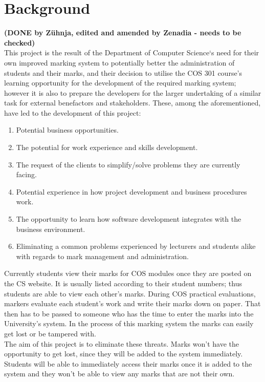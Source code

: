 \documentclass[11pt,a4paper]{article}
\begin{document}
\section{Background}
\textbf{(DONE by Z\"uhnja, edited and amended by Zenadia - needs to be checked)}\\
This project is the result of the Department of Computer Science‘s need for their own improved marking system to potentially better the administration of students and their marks, and their decision to utilise the COS 301 course’s learning opportunity for the development of the required marking system; however it is also to prepare the developers for the larger undertaking of a similar task for external benefactors and stakeholders. These, among the aforementioned, have led to the development of this project:
\begin{enumerate}
	\item Potential business opportunities.
	\item The potential for work experience and skills development.
	\item The request of the clients to simplify/solve problems they are currently facing.
	\item Potential experience in how project development and business procedures work.
	\item The opportunity to learn how software development integrates with the business environment.
	\item Eliminating a common problems experienced by lecturers and students alike with regards to mark management and administration.
\end{enumerate}
Currently students view their marks for COS modules once they are posted on the CS website.  It is usually listed according to their student numbers; thus students are able to view each other's marks. 
During COS practical evaluations, markers evaluate each student's work and write their marks down on paper. That then has to be passed to someone who has the time to enter the marks into the University's system. In the process of this marking system the marks can easily get lost or be tampered with. \\
The aim of this project is to eliminate these threats. Marks won't have the opportunity to get lost, since they will be added to the system immediately. Students will be able to immediately access their marks once it is added to the system and they won't be able to view any marks that are not their own. 
\end{document}
